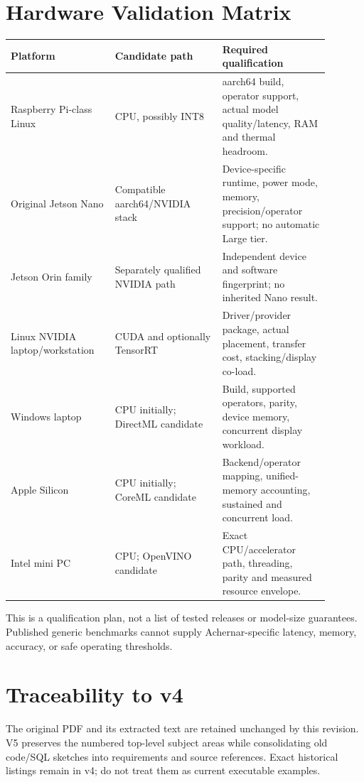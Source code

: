 \documentclass[11pt,a4paper]{article}
\begin{document}
\section{Hardware Validation Matrix}
\begin{longtable}{@{}L{0.29\linewidth}L{0.30\linewidth}L{0.30\linewidth}@{}}
\toprule Platform & Candidate path & Required qualification\\\midrule\endhead
Raspberry Pi-class Linux & CPU, possibly INT8 & aarch64 build, operator support,
actual model quality/latency, RAM and thermal headroom.\\
Original Jetson Nano & Compatible aarch64/NVIDIA stack & Device-specific runtime,
power mode, memory, precision/operator support; no automatic Large tier.\\
Jetson Orin family & Separately qualified NVIDIA path & Independent device and
software fingerprint; no inherited Nano result.\\
Linux NVIDIA laptop/workstation & CUDA and optionally TensorRT & Driver/provider
package, actual placement, transfer cost, stacking/display co-load.\\
Windows laptop & CPU initially; DirectML candidate & Build, supported operators,
parity, device memory, concurrent display workload.\\
Apple Silicon & CPU initially; CoreML candidate & Backend/operator mapping,
unified-memory accounting, sustained and concurrent load.\\
Intel mini PC & CPU; OpenVINO candidate & Exact CPU/accelerator path,
threading, parity and measured resource envelope.\\
\bottomrule
\end{longtable}
This is a qualification plan, not a list of tested releases or model-size
guarantees. Published generic benchmarks cannot supply Achernar-specific
latency, memory, accuracy, or safe operating thresholds.

\section{Traceability to v4}
The original PDF and its extracted text are retained unchanged by this revision.
V5 preserves the numbered top-level subject areas while consolidating old
code/SQL sketches into requirements and source references. Exact historical
listings remain in v4; do not treat them as current executable examples.
\end{document}
